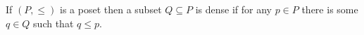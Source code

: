 \documentclass[12pt]{article}
\begin{document}
If $(P,\leq)$ is a poset then a subset $Q\subseteq P$ is dense if for any $p\in P$ there is some $q\in Q$ such that $q\leq p$.
\end{document}
